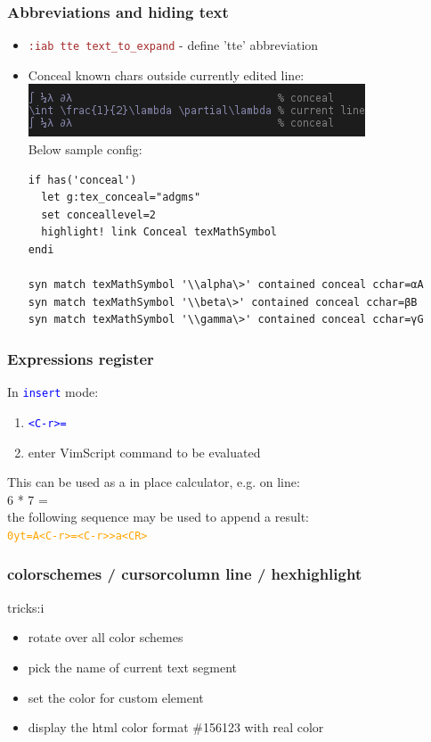 \documentclass{beamer}
\newcommand{\vimmode}[1]{\texttt{#1}}
\newcommand{\viminsert}[1]{\texttt{\textcolor{blue}{#1}}}
\newcommand{\vimnormal}[1]{\texttt{\textcolor{orange}{#1}}}
\newcommand{\vimcommand}[1]{\texttt{\textcolor{brown}{#1}}}
\begin{document}
\begin{frame}[fragile]
    \frametitle{Abbreviations and hiding text}
    \begin{itemize}
      \item \vimcommand{:iab tte text\_to\_expand} - define 'tte' abbreviation
        \item Conceal known chars outside currently edited line:\\
 \includegraphics[scale=0.6]{vim_conceal_example.png}\\
\textrm{Below sample config:}
{\footnotesize
\begin{verbatim}
if has('conceal')
  let g:tex_conceal="adgms"
  set conceallevel=2
  highlight! link Conceal texMathSymbol
endi

syn match texMathSymbol '\\alpha\>' contained conceal cchar=αA
syn match texMathSymbol '\\beta\>' contained conceal cchar=βB
syn match texMathSymbol '\\gamma\>' contained conceal cchar=γG
\end{verbatim}
}
    \end{itemize}
\end{frame}

\begin{frame}
    \frametitle{Expressions register}
    In \viminsert{\vimmode{insert}} mode:
    \begin{enumerate}
        \item \viminsert{\textless{}C-r\textgreater{}=}
        \item enter VimScript command to be evaluated
    \end{enumerate}
    This can be used as a in place calculator, e.g. on line:\\
    \textrm{6 * 7 =}\\
    the following sequence may be used to append a result:\\
    \vimnormal{0yt=A\textless{}C-r\textgreater{}=\textless{}C-r\textgreater>a\textless{}CR\textgreater}
\end{frame}

\begin{frame}
    \frametitle{colorschemes / cursorcolumn line / hexhighlight}
    tricks:i
    \begin{itemize}
        \item    rotate over all color schemes
        \item pick the name of current text segment
        \item set the color for custom element
        \item display the html color format \#156123 with real color
    \end{itemize}
\end{frame}
\end{document}
